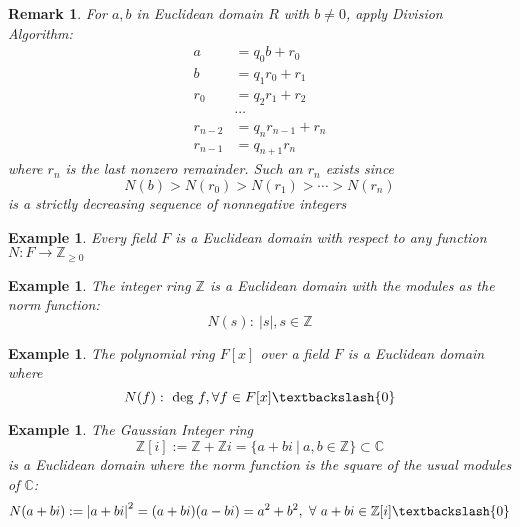 \documentclass[a4paper,8pt]{article}
\newcommand{\C}{\mathbb{C}}
\newcommand{\Z}{\mathbb{Z}}
\newcommand{\abs}[1]{\left\lvert#1\right\rvert}
\newcommand{\hlt}[1]{\textit{{\color{blue}#1}}}
\newcommand{\degs}[1]{\textnormal{deg}#1}
\theoremstyle{theorem}
\newtheorem{example}[theorem]{Example}
\newtheorem{remark}[theorem]{Remark}
\begin{document}
\begin{remark}
For $a,b$ in Euclidean domain $R$ with $b \neq 0$, apply Division Algorithm:
\begin{align}
	a &= q_0 b + r_0 \nonumber \\
	b &= q_1 r_0 + r_1 \nonumber \\
	r_0 &= q_2 r_1 + r_2 \nonumber \\
	&\cdots \nonumber \\
	r_{n-2} &= q_n r_{n-1} + r_n \nonumber \\
	r_{n-1} &= q_{n+1} r_n \nonumber
\end{align}
where $r_n$ is the last nonzero remainder. Such an $r_n$ exists since
\begin{equation}
N(b) > N(r_0) > N(r_1) > \cdots > N(r_n) \nonumber
\end{equation}
is a strictly decreasing sequence of nonnegative integers
\end{remark}

\begin{example}
Every field $F$ is a Euclidean domain with respect to any function $N: F \rightarrow \Z_{\geq 0}$
\end{example}

\begin{example}
The integer ring $\Z$ is a Euclidean domain with the modules as the norm function:
\begin{equation}
N(s) :\ \abs{s}, s \in \Z \nonumber
\end{equation}	
\end{example}

\begin{example}
The polynomial ring $F[x]$ over a field $F$ is a Euclidean domain where
\begin{equation}
N(f) :\ \degs \ f, \forall f \in F[x] \textbackslash \{0\} \nonumber
\end{equation}	
\end{example}

\begin{example}
The \hlt{Gaussian Integer} ring
\begin{equation}
\Z [i] := \Z + \Z i = \{a+bi\ |\ a,b \in \Z \} \subset \C \nonumber
\end{equation}	
is a Euclidean domain where the norm function is the square of the usual modules of $\C$:
\begin{equation}
N(a+bi) := \abs{a+bi}^2 = (a+bi)(a-bi) = a^2 + b^2, \ \forall \ a+bi \in \Z [i] \textbackslash \{0\} \nonumber
\end{equation}
\end{example}
\end{document}
